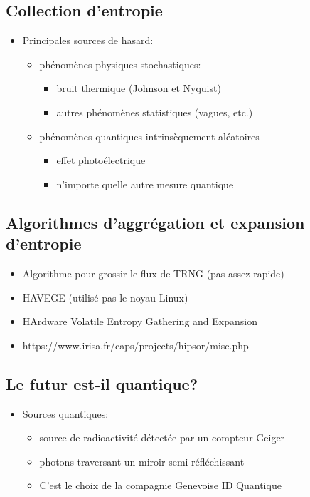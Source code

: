 \documentclass{scrartcl}
\begin{document}
\subsection{Collection d'entropie}
 \begin{itemize}
 \item Principales sources de hasard:
  \begin{itemize}
  \item phénomènes physiques stochastiques:
   \begin{itemize}
   \item bruit thermique (Johnson et Nyquist)
   \item autres phénomènes statistiques (vagues, etc.)
   \end{itemize}
  \item phénomènes quantiques intrinsèquement aléatoires
   \begin{itemize}
   \item effet photoélectrique
   \item n’importe quelle autre mesure quantique
   \end{itemize}
  \end{itemize}
 \end{itemize}


\subsection{Algorithmes d'aggrégation et expansion d'entropie}
 \begin{itemize}
 \item Algorithme pour grossir le flux de TRNG (pas assez rapide)
 \item HAVEGE (utilisé pas le noyau Linux)
 \item HArdware Volatile Entropy Gathering and Expansion
 \item https://www.irisa.fr/caps/projects/hipsor/misc.php
 \end{itemize}

\subsection{Le futur est-il quantique?}
 \begin{itemize}
 \item Sources quantiques:
  \begin{itemize}
  \item source de radioactivité détectée par un compteur Geiger
  \item photons traversant un miroir semi-réfléchissant
  \item C’est le choix de la compagnie Genevoise ID Quantique
  \end{itemize}
 \end{itemize}
\end{document}
